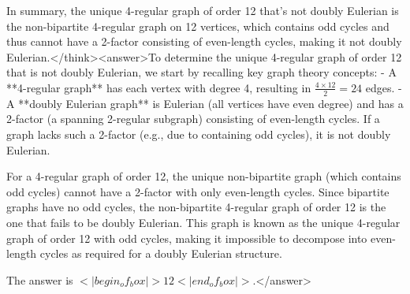 In summary, the unique 4-regular graph of order 12 that's not doubly Eulerian is the non-bipartite 4-regular graph on 12 vertices, which contains odd cycles and thus cannot have a 2-factor consisting of even-length cycles, making it not doubly Eulerian.</think><answer>To determine the unique 4-regular graph of order 12 that is not doubly Eulerian, we start by recalling key graph theory concepts:  
- A **4-regular graph** has each vertex with degree 4, resulting in \( \frac{4 \times 12}{2} = 24 \) edges.  
- A **doubly Eulerian graph** is Eulerian (all vertices have even degree) and has a 2-factor (a spanning 2-regular subgraph) consisting of even-length cycles. If a graph lacks such a 2-factor (e.g., due to containing odd cycles), it is not doubly Eulerian.  

For a 4-regular graph of order 12, the unique non-bipartite graph (which contains odd cycles) cannot have a 2-factor with only even-length cycles. Since bipartite graphs have no odd cycles, the non-bipartite 4-regular graph of order 12 is the one that fails to be doubly Eulerian. This graph is known as the unique 4-regular graph of order 12 with odd cycles, making it impossible to decompose into even-length cycles as required for a doubly Eulerian structure.  

The answer is \(<|begin_of_box|>12<|end_of_box|>\).</answer>
